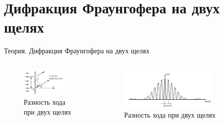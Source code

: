 \documentclass[11pt]{beamer} %
\begin{document}
    \section{Дифракция Фраунгофера на двух щелях}
    \begin{frame}{Теория. Дифракция Фраунгофера на двух щелях}
        \begin{columns}
            \begin{figure}[H]
                \centering
                \includegraphics[width = 0.8\textwidth]{images/thoery_two_slit.jpg}
                \caption{Разность хода при двух щелях}
            \end{figure}
            \begin{figure}[H]
                \centering
                \includegraphics[width = 0.8\textwidth]{images/theory_two_slit_destr.jpg}
                \caption{Разность хода при двух щелях}
            \end{figure}
            

\end{columns}
\end{frame}
\end{document}
